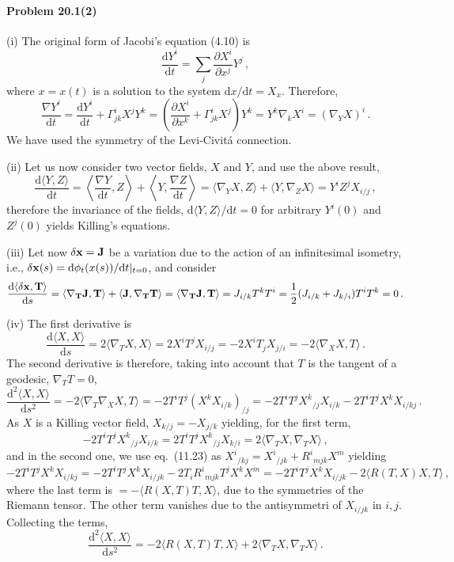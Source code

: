 \documentclass[a4paper,12pt]{article}
\def\d{\mathrm{d}}
\newcommand{\problem}[1]{\paragraph{Problem #1}}
\begin{document}

\problem{20.1(2)} (i) The original form of Jacobi's equation (4.10) is
\[
 \frac{\d Y^i}{\d t} = \sum_j \frac{\partial X^i}{\partial x^j}Y^j\,,
\]
where $x=x(t)$ is a solution to the system $\d x/\d t = X_x$. Therefore,
\[
 \frac{\nabla Y^i}{\d t} = \frac{\d Y^i}{\d t} + \Gamma^i_{jk}X^j Y^k=\left(\frac{\partial X^i}{\partial x^k} + \Gamma^i_{jk}X^j\right)Y^k = Y^k \nabla_k X^i = (\nabla_Y X)^i\,.
\]
We have used the symmetry of the Levi-Civitá connection.

(ii) Let us now consider two vector fields, $X$ and $Y$, and use the above result,
\[
 \frac{\d\langle Y, Z\rangle}{\d t} = \left\langle \frac{\nabla Y}{\d t}, Z\right\rangle + \left\langle Y, \frac{\nabla Z}{\d t}\right\rangle  = \langle \nabla_Y X, Z\rangle + \langle Y, \nabla_Z X\rangle = Y^i Z^j X_{i/j}  \,,
\]
therefore the invariance of the fields, $\d \langle Y, Z\rangle /\d t =0$ for arbitrary $Y^i(0)$ and $Z^j(0)$
yields Killing's equations.

(iii) Let now $\delta {\bf x} = {\bf J}$ be a variation due to the action of an infinitesimal isometry, i.e., $\delta {\bf x}(s) = \d \phi_t(x(s))/\d t|_{t=0}$, and consider
\[
 \frac{\d\langle \delta{\bf x}, {\bf T}\rangle}{\d s} = \langle \nabla_{\bf T}{\bf J}, {\bf T} \rangle + \langle {\bf J}, \nabla_{\bf T}{\bf T}\rangle = \langle \nabla_{\bf T}{\bf J}, {\bf T} \rangle = J_{i/k}T^kT^i = \frac{1}{2}(J_{i/k}+J_{k/i})T^i T^k = 0\,.
\]

(iv) The first derivative is
\[
 \frac{\d\langle X, X\rangle}{\d s} = 2\langle \nabla_T X, X\rangle = 2 X^i T^j X_{i/j} = -2 X^i T_j X_{j/i} = -2\langle \nabla_X X, T\rangle\,.
\]
The second derivative is therefore, taking into account that $T$ is the tangent of a geodesic, $\nabla_T T=0$,
\[
 \frac{\d^2\langle X, X\rangle}{\d s^2} = -2 \langle \nabla_T \nabla_X X, T\rangle = -2 T^i T^j (X^k X_{i/k})_{/j}=-2T^i T^j X^k{}_{/j}X_{i/k} -2 T^i T^j X^k X_{i/kj}\,.
\]
As $X$ is a Killing vector field, $X_{k/j} = -X_{j/k}$ %
yielding, for the first term,
\[
 -2T^i T^j X^k{}_{/j}X_{i/k} = 2 T^i T^j X^k{}_{/j}X_{k/i} = 2\langle \nabla_T X, \nabla_T X\rangle\,,
\]
and in the second one, we use eq.\ (11.23) as $X^i{}_{/kj} = X^i{}_{/jk} + R^i{}_{mjk}X^m$ yielding
\[
 -2T^i T^j X^k X_{i/kj} = -2T^i T^j X^k X_{i/jk} -2T_i R^i{}_{mjk}T^j X^kX^m = -2 T^i T^j X^k X_{i/jk} - 2\langle R(T, X)X , T\rangle\,,
\]
where the last term is $=-\langle R(X,T)T, X\rangle$, due to the symmetries of the Riemann tensor. The other term vanishes due to the antisymmetri of $X_{i/jk}$ in $i,j$. Collecting the terms,
\[
 \frac{\d^2\langle X, X\rangle}{\d s^2} = -2\langle R(X, T)T, X\rangle + 2\langle \nabla_T X, \nabla_T X\rangle\,.
\]
\end{document}
